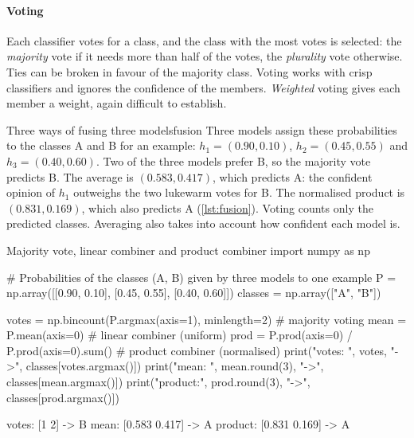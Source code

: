\paragraph{Voting} Each classifier votes for a class, and the class with the most votes is
selected: the \emph{majority} vote if it needs more than half of the votes, the
\emph{plurality} vote otherwise. Ties can be broken in favour of the majority class. Voting
works with crisp classifiers and ignores the confidence of the members. \emph{Weighted} voting
gives each member a weight, again difficult to establish.

\begin{example}{Three ways of fusing three models}{fusion}
Three models assign these probabilities to the classes A and B for an example:
$h_1=(0.90,0.10)$, $h_2=(0.45,0.55)$ and $h_3=(0.40,0.60)$. Two of the three models prefer B,
so the majority vote predicts B. The average is $(0.583,0.417)$, which predicts A: the
confident opinion of $h_1$ outweighs the two lukewarm votes for B. The normalised product is
$(0.831,0.169)$, which also predicts A (\cref{lst:fusion}). Voting counts only the predicted classes. Averaging also takes into account how confident each model is.
\end{example}

\begin{pylisting}[label={lst:fusion}]{Majority vote, linear combiner and product combiner}
import numpy as np

# Probabilities of the classes (A, B) given by three models to one example
P = np.array([[0.90, 0.10],
              [0.45, 0.55],
              [0.40, 0.60]])
classes = np.array(["A", "B"])

votes = np.bincount(P.argmax(axis=1), minlength=2)   # majority voting
mean = P.mean(axis=0)                                 # linear combiner (uniform)
prod = P.prod(axis=0) / P.prod(axis=0).sum()          # product combiner (normalised)
print("votes:  ", votes, "->", classes[votes.argmax()])
print("mean:   ", mean.round(3), "->", classes[mean.argmax()])
print("product:", prod.round(3), "->", classes[prod.argmax()])
\end{pylisting}
\begin{pyoutput}
votes:   [1 2] -> B
mean:    [0.583 0.417] -> A
product: [0.831 0.169] -> A
\end{pyoutput}


